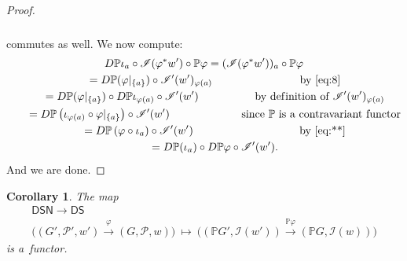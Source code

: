 \documentclass[pdftex]{sigma}
\numberwithin{equation}{section}
\newtheorem{Corollary}[Theorem]{Corollary}
\begin{document}
\begin{proof}
\begin{gather}
\begin{split}
\end{split}
\end{gather}
commutes as well.
We now compute:
\begin{gather*}
D\mathbb{P}\iota_a \circ \mathscr{I} (\varphi^*w')\circ \mathbb{P}\varphi  =   (\mathscr{I} (\varphi^*w'))_a \circ
\mathbb{P}\varphi
\\
\qquad
  =   D \mathbb{P} (\varphi|_{\{a\}})\circ \mathscr{I}' (w')_{\varphi(a)}
\qquad
\hspace{21mm}
\text{by~\eqref{eq:8}}
\\
\qquad
  =   D \mathbb{P} (\varphi|_{\{a\}})\circ D\mathbb{P} \iota_{\varphi(a)} \circ \mathscr{I}' (w')
\hspace{18mm}
\text{by def\/inition of}~\mathscr{I}' (w')_{\varphi(a)}
\\
\qquad
  =   D \mathbb{P} \left(\iota_{\varphi(a)} \circ \varphi|_{\{a\}} \right) \circ \mathscr{I}' (w')
\hspace{23mm}
\text{since $\mathbb{P}$ is a~contravariant functor}
\\
\qquad
  =   D \mathbb{P} \left(\varphi \circ \iota_a \right) \circ \mathscr{I}' (w')
\hspace{34mm}
\text{by~\eqref{eq:**}}
\\
\qquad
  =   D \mathbb{P} (\iota_a) \circ D\mathbb{P} \varphi \circ \mathscr{I}' (w').
\end{gather*}
And we are done.
\end{proof}

\begin{Corollary}
The map
\begin{gather*}
\mathsf{DSN} \to \mathsf{DS}
\\
\big((G',{\mathcal P}', w') \xrightarrow{\varphi} (G,{\mathcal P},w)\big)
\ \mapsto \ \big((\mathbb{P} G', \mathscr{I} (w'))\xrightarrow{\mathbb{P} \varphi} (\mathbb{P} G, \mathscr{I} (w))\big)
\end{gather*}
is a~functor.
\end{Corollary}
\end{document}
